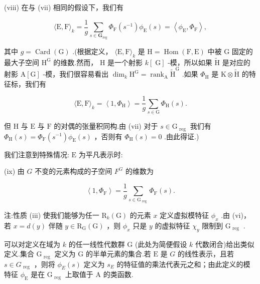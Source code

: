 \documentclass[10pt]{article}
\begin{document}
(viii) 在与 (vii) 相同的假设下，我们有

\[
\langle \mathrm{E},\mathrm{F}{\rangle }_{k} = \frac{1}{g}\mathop{\sum }\limits_{{s \in  {\mathbf{G}}_{\mathrm{{reg}}}}}{\Phi }_{\mathrm{F}}\left( {s}^{-1}\right) {\phi }_{\mathrm{E}}\left( s\right)  = \left\langle  {{\phi }_{\mathrm{E}},{\Phi }_{\mathrm{F}}}\right\rangle  ,
\]

其中 \(g = \operatorname{Card}\left( \mathrm{G}\right)\) .(根据定义， \(\langle \mathrm{E},\mathrm{F}{\rangle }_{k}\) 是 \(\mathrm{H} = \operatorname{Hom}\left( {\mathrm{F},\mathrm{E}}\right)\) 中被 \(\mathrm{G}\) 固定的最大子空间 \({\mathrm{H}}^{\mathrm{G}}\) 的维数.然而， \(\mathrm{H}\) 是一个射影 \(k\left\lbrack  \mathrm{\;G}\right\rbrack\) -模，所以如果 \(\widetilde{\mathrm{H}}\) 是对应的射影 \(\mathrm{A}\left\lbrack  \mathrm{G}\right\rbrack\) -模，我们很容易看出 \({\dim }_{k}{\mathrm{H}}^{\mathrm{G}} = {\operatorname{rank}}_{\mathrm{A}}{\widetilde{\mathrm{H}}}^{\mathrm{G}}\) .如果 \({\Phi }_{\mathrm{H}}\) 是 \(\mathrm{K} \otimes  \widetilde{\mathrm{H}}\) 的特征标，我们有

\[
\langle \mathrm{E},\mathrm{F}{\rangle }_{k} = \left\langle  {1,{\Phi }_{\mathrm{H}}}\right\rangle   = \frac{1}{g}\mathop{\sum }\limits_{{s \in  \mathrm{G}}}{\Phi }_{\mathrm{H}}\left( s\right) .
\]

但 \(\mathrm{H}\) 与 \(\mathrm{E}\) 与 \(\mathrm{F}\) 的对偶的张量积同构.由 (vii) 对于 \(s \in  {\mathrm{G}}_{\text{ reg }}\) 我们有 \({\Phi }_{\mathrm{H}}\left( s\right)  = {\Phi }_{\mathrm{F}}\left( {s}^{-1}\right) {\phi }_{\mathrm{E}}\left( s\right)\) ，否则有 \({\Phi }_{\mathrm{H}}\left( s\right)  = 0\) .由此得证.)

我们注意到特殊情况: \(\mathrm{E}\) 为平凡表示时:

(ix) 由 \(G\) 不变的元素构成的子空间 \({F}^{G}\) 的维数为

\[
\left\langle  {1,{\Phi }_{\mathrm{F}}}\right\rangle   = \frac{1}{g}\mathop{\sum }\limits_{{s \in  {\mathrm{G}}_{\text{ reg }}}}{\Phi }_{\mathrm{F}}\left( s\right) .
\]

注:性质 (iii) 使我们能够为任一 \({\mathrm{R}}_{k}\left( \mathrm{G}\right)\) 的元素 \(x\) 定义虚拟模特征 \({\phi }_{x}\) .由 (vi)，若 \(x = d\left( y\right)\) 伴随 \(y \in  {\mathrm{R}}_{\mathrm{G}}\left( \mathrm{G}\right)\) ，则 \({\phi }_{x}\) 只是 \(y\) 的虚拟特征 \({\chi }_{y}\) 限制到 \({\mathrm{G}}_{\text{ reg }}\) .

可以对定义在域为 \(k\) 的任一线性代数群 \(\mathrm{G}\) (此处为简便假设 \(k\) 代数闭合)给出类似定义.集合 \({\mathrm{G}}_{\text{ reg }}\) 定义为 \(\mathrm{G}\) 的半单元素的集合.若 \(\mathrm{E}\) 是 \(G\) 的线性表示，且若 \(s \in  {G}_{\text{ reg }}\) ，则将 \({\phi }_{E}\left( s\right)\) 定义为 \({s}_{E}\) 的特征值的乘法代表元之和；由此定义的模特征 \({\phi }_{\mathrm{E}}\) 是在 \({\mathrm{G}}_{\text{ reg }}\) 上取值于 \(\mathrm{A}\) 的类函数.
\end{document}
